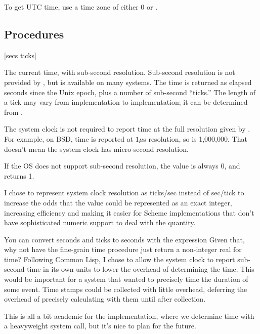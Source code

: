     To get UTC time, use a time zone of either 0 or .

\subsection{Procedures}
 {} {[secs ticks]}
  {} \real
\begin{desc}
    The current time, with sub-second resolution.
    Sub-second resolution is not provided by {\Posix},
    but is available on many systems.
    The time is returned as elapsed seconds since the Unix epoch, plus
    a number of sub-second ``ticks.''
    The length of a tick may vary from implementation to implementation;
    it can be determined from .

    The system clock is not required to report time at the full resolution
    given by . For example, on BSD, time is reported at
    $1\mu$s resolution, so  is 1,000,000. That doesn't mean
    the system clock has micro-second resolution.

    If the OS does not support sub-second resolution, the  value
    is always 0, and  returns 1.

    \begin{remarkenv}
        I chose to represent system clock resolution as ticks/sec
        instead of sec/tick to increase the odds that the value could
        be represented as an exact integer, increasing efficiency and
        making it easier for Scheme implementations that don't have
        sophisticated numeric support to deal with the quantity.

        You can convert seconds and ticks to seconds with the expression
        Given that, why not have the fine-grain time procedure just
        return a non-integer real for time? Following Common Lisp, I chose to
        allow the system clock to report sub-second time in its own units to
        lower the overhead of determining the time.  This would be important
        for a system that wanted to precisely time the duration of some
        event. Time stamps could be collected with little overhead, deferring
        the overhead of precisely calculating with them until after collection.
        
        This is all a bit academic for the {\scm} implementation, where
        we determine time with a heavyweight system call, but it's nice
        to plan for the future.
    \end{remarkenv}
\end{desc}

